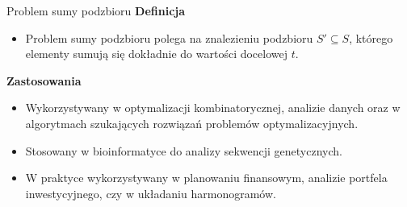 \begin{frame}{Problem sumy podzbioru}
\textbf{Definicja}
\begin{itemize}
	\item Problem sumy podzbioru polega na znalezieniu podzbioru $S' \subseteq S$, którego elementy sumują się dokładnie do wartości docelowej $t$. 
\end{itemize}
\vspace{10pt}

\textbf{Zastosowania}
\begin{itemize}
	\item Wykorzystywany w optymalizacji kombinatorycznej, analizie danych oraz w algorytmach szukających rozwiązań problemów optymalizacyjnych.
	\item Stosowany w bioinformatyce do analizy sekwencji genetycznych.
	\item W praktyce wykorzystywany w planowaniu finansowym, analizie portfela inwestycyjnego, czy w układaniu harmonogramów.
\end{itemize}	
\end{frame}
	